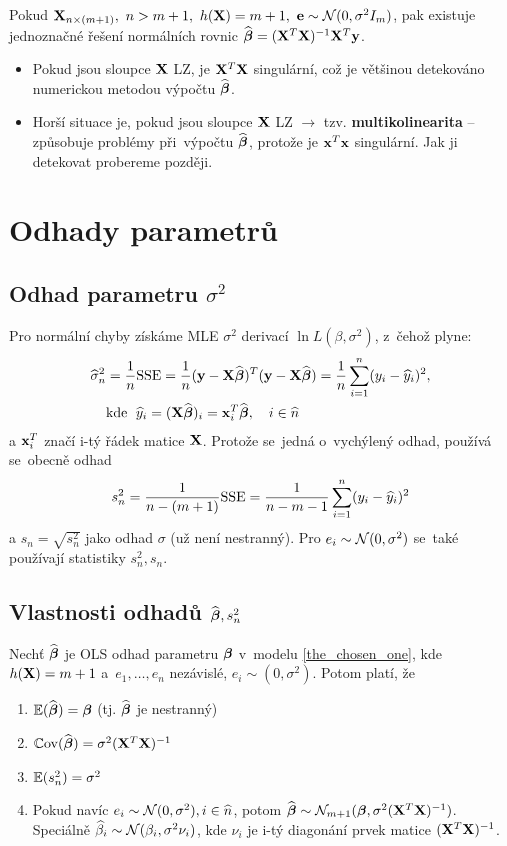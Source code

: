 \begin{remark}
	Pokud $\mathbf{X}_{n\times(m+1)},~n>m+1,~h(\mathbf{X}) = m+1,~\mathbf{e}\sim\mathcal{N}(0,\sigma^2 I_m)$, pak existuje jednoznačné řešení normálních rovnic $\widehat{\boldsymbol{\beta}} = (\mathbf{X}^T\mathbf{X})^{-1}\mathbf{X}^T\mathbf{y}$.
\end{remark}
\begin{remark}
	\begin{itemize}
		\item Pokud jsou sloupce $\mathbf{X}$ LZ, je $\mathbf{X}^T\mathbf{X}$ singulární, což je většinou detekováno numerickou metodou výpočtu $\widehat{\boldsymbol{\beta}}$.
		\item Horší situace je, pokud jsou sloupce $\mathbf{X}$  LZ $\rightarrow$ tzv. \textbf{multikolinearita} -- způsobuje problémy při~výpočtu $\widehat{\boldsymbol{\beta}}$, protože je $\mathbf{x}^T\mathbf{x}$  singulární. Jak ji detekovat probereme později.
	\end{itemize}
\end{remark}

\section{Odhady parametrů}
\subsection{Odhad parametru $\sigma^2$ }
Pro normální chyby získáme MLE $\sigma^2$ derivací $\ln L(\beta, \sigma^2)$, z~čehož plyne:
\begin{align*}
	\widehat{\sigma}_n^2 & = \frac{1}{n} \mathrm{SSE} = \frac{1}{n}(\mathbf{y} - \mathbf{X} \widehat{\boldsymbol{\beta}})^T(\mathbf{y} - \mathbf{X} \widehat{\boldsymbol{\beta}}) = \frac{1}{n} \sum\limits_{i=1}^{n} (y_i - \widehat{y}_i)^2, \\
	& \text{kde \;} \widehat{y}_i = (\mathbf{X} \widehat{\boldsymbol{\beta}})_i = \mathbf{x}_i^T \widehat{\boldsymbol{\beta}}, \quad i\in\widehat{n} \\
\end{align*}
a $\mathbf{x}_i^T$ značí i-tý řádek matice $\mathbf{X}$. Protože se~jedná o~vychýlený odhad, používá se~obecně odhad
 $$
	s_n^2 = \frac{1}{n-(m+1)} \mathrm{SSE} = \frac{1}{n - m - 1} \sum\limits_{i=1}^{n} (y_i - \widehat{y}_i)^2
 $$
a $s_n = \sqrt{s_n^2}$ jako odhad $\sigma$ (už není nestranný).
Pro $e_i \sim \mathcal{N}(0,\sigma^2)$ se~také používají statistiky $s_n^2, s_n$.

\subsection{Vlastnosti odhadů $\widehat{\boldsymbol{\beta}}, s_n^2$ }
\begin{theorem}
	Nechť $\widehat{\boldsymbol{\beta}}$ je OLS odhad parametru $\boldsymbol{\beta}$ v~modelu \eqref{the_chosen_one}, kde $h(\mathbf{X}) = m+1$ a~$e_1,\dots, e_n$ nezávislé, $e_i \sim (0,\sigma^2)$. Potom platí, že
	\begin{enumerate}
		\item $\mathbb{E}(\widehat{\boldsymbol{\beta}}) = \boldsymbol{\beta}$ (tj. $\widehat{\boldsymbol{\beta}}$ je nestranný)
		\item $\mathbb{C}\mathrm{ov}(\widehat{\boldsymbol{\beta}}) = \sigma^2 (\mathbf{X}^T \mathbf{X})^{-1}$
		\item $\mathbb{E}(s_n^2) = \sigma^2$
		\item Pokud navíc $e_i \sim \mathcal{N}(0,\sigma^2), i\in\widehat{n} $, potom $\widehat{\boldsymbol{\beta}} \sim \mathcal{N}_{m+1}(\boldsymbol{\beta}, \sigma^2(\mathbf{X}^T \mathbf{X})^{-1})$. Speciálně $\widehat{\beta}_i \sim \mathcal{N}(\beta_i, \sigma^2 \nu_i)$, kde $\nu_i$ je i-tý diagonání prvek matice $(\mathbf{X}^T \mathbf{X})^{-1}$.
	\end{enumerate}
\end{theorem}

